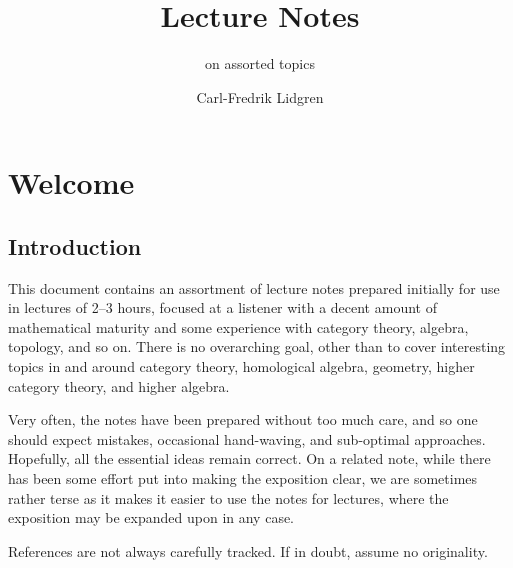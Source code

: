 \documentclass[a4paper, 11pt]{article}
\title{Lecture Notes}
\author{on assorted topics}
\date{Carl-Fredrik Lidgren}
\newcommand{\1}{\ensuremath{\mathbb{1}}}
\newcommand{\2}{\ensuremath{\mathbb{2}}}
\newcommand{\3}{\ensuremath{\mathbb{3}}}
\begin{document}
\maketitle


\tableofcontents

\clearpage
\setcounter{section}{-1}
\section{Welcome}
\subsection{Introduction}
This document contains an assortment of lecture notes prepared initially for use
in lectures of 2--3 hours, focused at a listener with a decent amount of
mathematical maturity and some experience with category theory, algebra,
topology, and so on. There is no overarching goal, other than to cover
interesting topics in and around category theory, homological algebra, geometry,
higher category theory, and higher algebra.

Very often, the notes have been prepared without too much care, and so one should expect mistakes, occasional hand-waving, and sub-optimal approaches. Hopefully, all the essential ideas
remain correct. On a related note, while there has been some effort put into making the exposition clear, we are sometimes rather terse as it makes it easier to use the notes
for lectures, where the exposition may be expanded upon in any case.

References are not always carefully tracked. If in doubt, assume no originality.
\end{document}
